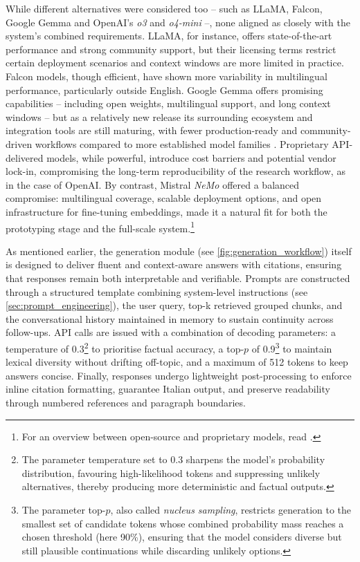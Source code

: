 \begin{spacing}{1.5}
While different alternatives were considered too -- such as LLaMA, Falcon, Google Gemma and OpenAI's \textit{o3} and \textit{o4-mini} --, none aligned as closely with the system’s combined requirements. LLaMA, for instance, offers state-of-the-art performance and strong community support, but their licensing terms restrict certain deployment scenarios and context windows are more limited in practice. Falcon models, though efficient, have shown more variability in multilingual performance, particularly outside English. Google Gemma offers promising capabilities -- including open weights, multilingual support, and long context windows -- but as a relatively new release its surrounding ecosystem and integration tools are still maturing, with fewer production-ready and community-driven workflows compared to more established model families \citep{team_gemma_2024}. Proprietary API-delivered models, while powerful, introduce cost barriers and potential vendor lock-in, compromising the long-term reproducibility of the research workflow, as in the case of OpenAI. By contrast, Mistral \textit{NeMo} offered a balanced compromise: multilingual coverage, scalable deployment options, and open infrastructure for fine-tuning embeddings, made it a natural fit for both the prototyping stage and the full-scale system.\footnote{For an overview between open-source and proprietary models, read \textcite{noauthor_open_2025}.}

As mentioned earlier, the generation module (see \autoref{fig:generation_workflow}) itself is designed to deliver fluent and context-aware answers with citations, ensuring that responses remain both interpretable and verifiable. Prompts are constructed through a structured template combining system-level instructions (see \autoref{sec:prompt_engineering}), the user query, top-k retrieved grouped chunks, and the conversational history maintained in memory to sustain continuity across follow-ups. API calls are issued with a combination of decoding parameters: a temperature of 0.3\footnote{The parameter temperature set to 0.3 sharpens the model’s probability distribution, favouring high-likelihood tokens and suppressing unlikely alternatives, thereby producing more deterministic and factual outputs.} to prioritise factual accuracy, a top-$p$ of 0.9\footnote{The parameter top-$p$, also called \textit{nucleus sampling}, restricts generation to the smallest set of candidate tokens whose combined probability mass reaches a chosen threshold (here 90\%), ensuring that the model considers diverse but still plausible continuations while discarding unlikely options.} to maintain lexical diversity without drifting off-topic, and a maximum of 512 tokens to keep answers concise. Finally, responses undergo lightweight post-processing to enforce inline citation formatting, guarantee Italian output, and preserve readability through numbered references and paragraph boundaries.




\end{spacing}
